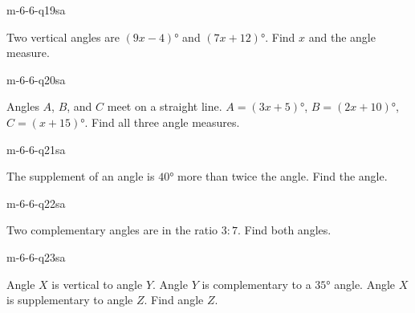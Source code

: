 
\begin{practiceQuestion}{m-6-6-q19}{sa}
\begin{questionText}
Two vertical angles are $(9x - 4)°$ and $(7x + 12)°$. Find $x$ and the angle measure.
\end{questionText}
\end{practiceQuestion}

\begin{practiceQuestion}{m-6-6-q20}{sa}
\begin{questionText}
Angles $A$, $B$, and $C$ meet on a straight line. $A = (3x + 5)°$, $B = (2x + 10)°$, $C = (x + 15)°$. Find all three angle measures.
\end{questionText}
\end{practiceQuestion}

\begin{practiceQuestion}{m-6-6-q21}{sa}
\begin{questionText}
The supplement of an angle is $40°$ more than twice the angle. Find the angle.
\end{questionText}
\end{practiceQuestion}

\begin{practiceQuestion}{m-6-6-q22}{sa}
\begin{questionText}
Two complementary angles are in the ratio $3:7$. Find both angles.
\end{questionText}
\end{practiceQuestion}

\begin{practiceQuestion}{m-6-6-q23}{sa}
\begin{questionText}
Angle $X$ is vertical to angle $Y$. Angle $Y$ is complementary to a $35°$ angle. Angle $X$ is supplementary to angle $Z$. Find angle $Z$.
\end{questionText}
\end{practiceQuestion}

